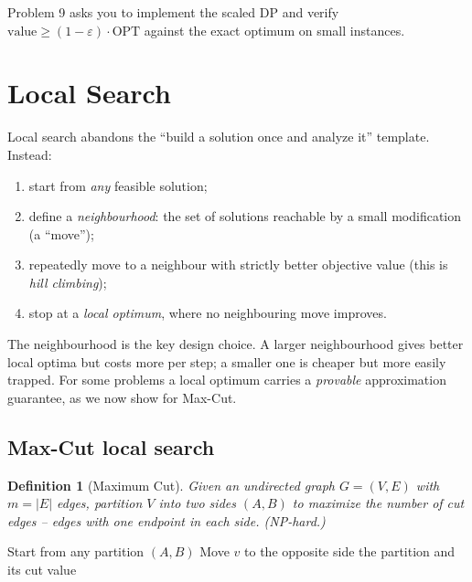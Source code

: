\documentclass[11pt]{article}
\newtheorem{definition}[theorem]{Definition}
\begin{document}
Problem 9 asks you to implement the scaled DP and verify $\text{value} \ge (1-\varepsilon)
\cdot \mathrm{OPT}$ against the exact optimum on small instances.

\section{Local Search}

Local search abandons the ``build a solution once and analyze it'' template. Instead:
\begin{enumerate}[label=(\arabic*)]
    \item start from \emph{any} feasible solution;
    \item define a \emph{neighbourhood}: the set of solutions reachable by a small
    modification (a ``move'');
    \item repeatedly move to a neighbour with strictly better objective value (this is
    \emph{hill climbing});
    \item stop at a \emph{local optimum}, where no neighbouring move improves.
\end{enumerate}

The neighbourhood is the key design choice. A larger neighbourhood gives better local
optima but costs more per step; a smaller one is cheaper but more easily trapped. For some
problems a local optimum carries a \emph{provable} approximation guarantee, as we now show
for Max-Cut.

\subsection{Max-Cut local search}

\begin{definition}[Maximum Cut]
Given an undirected graph $G = (V, E)$ with $m = |E|$ edges, partition $V$ into two sides
$(A, B)$ to maximize the number of \emph{cut} edges -- edges with one endpoint in each
side. (NP-hard.)
\end{definition}

\begin{algorithm}[h]
\caption{Max-Cut Local Search (Flip a Vertex) (Problem 10)}
\begin{algorithmic}[1]
\State Start from any partition $(A, B)$ 
    \State Move $v$ to the opposite side 
\EndWhile
\State \Return the partition and its cut value
\end{algorithmic}
\end{algorithm}
\end{document}

